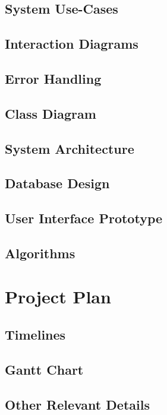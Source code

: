 \documentclass[12pt,a4paper]{report}
\begin{document}
\section{System Use-Cases}
\section{Interaction Diagrams}
\section{Error Handling}
\section{Class Diagram}
\section{System Architecture}
\section{Database Design}
\section{User Interface Prototype}
\section{Algorithms}

\chapter{Project Plan}
\section{Timelines}
\section{Gantt Chart}
\section{Other Relevant Details}



\end{document}
